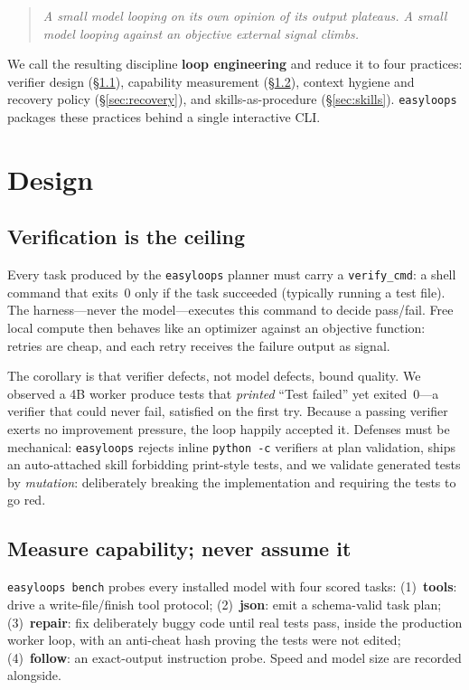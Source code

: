 \documentclass[11pt]{article}
\newcommand{\el}{\texttt{easyloops}}
\newcommand{\code}[1]{\texttt{#1}}
\begin{document}
\begin{quote}
\emph{A small model looping on its own opinion of its output plateaus. A small model looping
against an objective external signal climbs.}
\end{quote}

We call the resulting discipline \textbf{loop engineering} and reduce it to four practices:
verifier design (\S\ref{sec:verify}), capability measurement (\S\ref{sec:bench}), context
hygiene and recovery policy (\S\ref{sec:recovery}), and skills-as-procedure
(\S\ref{sec:skills}). \el{} packages these practices behind a single interactive CLI.

\section{Design}

\subsection{Verification is the ceiling}\label{sec:verify}

Every task produced by the \el{} planner must carry a \code{verify\_cmd}: a shell command that
exits~0 only if the task succeeded (typically running a test file). The harness---never the
model---executes this command to decide pass/fail. Free local compute then behaves like an
optimizer against an objective function: retries are cheap, and each retry receives the failure
output as signal.

The corollary is that verifier defects, not model defects, bound quality. We observed a 4B
worker produce tests that \emph{printed} ``Test failed'' yet exited~0---a verifier that could
never fail, satisfied on the first try. Because a passing verifier exerts no improvement
pressure, the loop happily accepted it. Defenses must be mechanical: \el{} rejects inline
\code{python -c} verifiers at plan validation, ships an auto-attached skill forbidding
print-style tests, and we validate generated tests by \emph{mutation}: deliberately breaking
the implementation and requiring the tests to go red.

\subsection{Measure capability; never assume it}\label{sec:bench}

\code{easyloops bench} probes every installed model with four scored tasks: (1)~\textbf{tools}:
drive a write-file/finish tool protocol; (2)~\textbf{json}: emit a schema-valid task plan;
(3)~\textbf{repair}: fix deliberately buggy code until real tests pass, inside the production
worker loop, with an anti-cheat hash proving the tests were not edited; (4)~\textbf{follow}: an
exact-output instruction probe. Speed and model size are recorded alongside.
\end{document}
